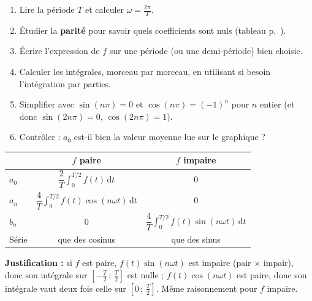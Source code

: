 \documentclass[a4paper,11pt]{article}
\begin{document}
\begin{methode}\label{meth:coefficients}
\begin{enumerate}
  \item Lire la période $T$ et calculer $\omega = \frac{2\pi}{T}$.
  \item Étudier la \textbf{parité} pour savoir quels coefficients sont nuls (tableau p.~\pageref{th:simplification}).
  \item Écrire l'expression de $f$ sur une période (ou une demi-période) bien choisie.
  \item Calculer les intégrales, morceau par morceau, en utilisant si besoin l'intégration par parties.
  \item Simplifier avec $\boxed{\sin(n\pi) = 0}$ et $\boxed{\cos(n\pi) = (-1)^n}$ pour $n$ entier (et donc $\sin(2n\pi) = 0$, $\cos(2n\pi) = 1$).
  \item Contrôler : $a_0$ est-il bien la valeur moyenne lue sur le graphique ?
\end{enumerate}
\end{methode}

\begin{theoreme}\label{th:simplification}
\begin{center}
\renewcommand{\arraystretch}{1.6}
\begin{tabular}{|l|c|c|}
\hline
\rowcolor{uimmlightblue}
 & $f$ \textbf{paire} & $f$ \textbf{impaire} \\
\hline
$a_0$ & $\dfrac2T\displaystyle\int_0^{T/2} f(t)\,\mathrm dt$ & $0$ \\
\hline
$a_n$ & $\dfrac4T\displaystyle\int_0^{T/2} f(t)\cos(n\omega t)\,\mathrm dt$ & $0$ \\
\hline
$b_n$ & $0$ & $\dfrac4T\displaystyle\int_0^{T/2} f(t)\sin(n\omega t)\,\mathrm dt$ \\
\hline
Série & que des cosinus & que des sinus \\
\hline
\end{tabular}
\end{center}
\textbf{Justification :} si $f$ est paire, $f(t)\sin(n\omega t)$ est impaire (pair $\times$ impair), donc son intégrale sur $\left[-\frac T2\,;\,\frac T2\right]$ est nulle ; $f(t)\cos(n\omega t)$ est paire, donc son intégrale vaut deux fois celle sur $\left[0\,;\,\frac T2\right]$. Même raisonnement pour $f$ impaire.
\end{theoreme}
\end{document}
